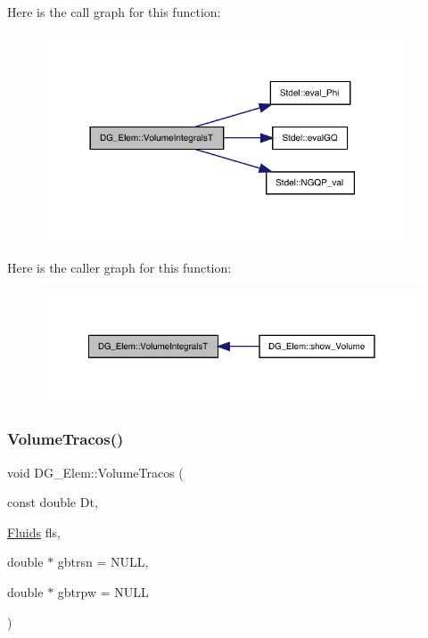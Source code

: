 Here is the call graph for this function\+:
\nopagebreak
\begin{figure}[H]
\begin{center}
\leavevmode
\includegraphics[width=302pt]{classDG__Elem_a2a2a90dfc3c456b66f7e1890d0f236f2_cgraph}
\end{center}
\end{figure}
Here is the caller graph for this function\+:
\nopagebreak
\begin{figure}[H]
\begin{center}
\leavevmode
\includegraphics[width=328pt]{classDG__Elem_a2a2a90dfc3c456b66f7e1890d0f236f2_icgraph}
\end{center}
\end{figure}
\mbox{\label{classDG__Elem_a84fab76e27b414367eb553f9d4841889}} 
\subsubsection{\texorpdfstring{Volume\+Tracos()}{VolumeTracos()}}
{\footnotesize\ttfamily void D\+G\+\_\+\+Elem\+::\+Volume\+Tracos (\begin{DoxyParamCaption}\item[{const double}]{Dt,  }\item[{\hyperlink{classFluids}{Fluids}}]{fls,  }\item[{double $\ast$}]{gbtrsn = {\ttfamily NULL},  }\item[{double $\ast$}]{gbtrpw = {\ttfamily NULL} }\end{DoxyParamCaption})}



